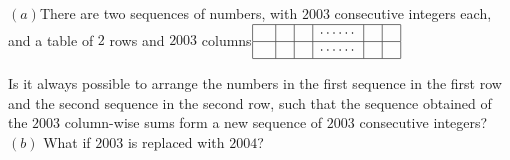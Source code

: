 $(a)$There are two sequences of numbers, with $2003$ consecutive integers each, and a table of $2$ rows and $2003$ columns$\begin{array}{|c|c|c|c|c|c|} \hline\ \ &\ &\ &\cdots\cdots&\ &\ \\ \hline \ &\ &\ &\cdots\cdots&\ &\ \\ \hline \end{array}$

Is it always possible to arrange the numbers in the first sequence in the first row and the second sequence in the second row, such that the sequence obtained of the $2003$ column-wise sums form a new sequence of $2003$ consecutive integers?$(b)$ What if $2003$ is replaced with $2004$?